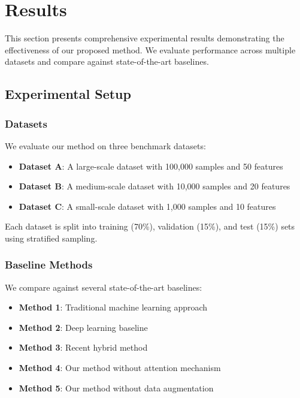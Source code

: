 \section{Results}

This section presents comprehensive experimental results demonstrating the effectiveness of our proposed method. We evaluate performance across multiple datasets and compare against state-of-the-art baselines.

\subsection{Experimental Setup}

\subsubsection{Datasets}

We evaluate our method on three benchmark datasets:

\begin{itemize}
    \item \textbf{Dataset A}: A large-scale dataset with 100,000 samples and 50 features
    \item \textbf{Dataset B}: A medium-scale dataset with 10,000 samples and 20 features
    \item \textbf{Dataset C}: A small-scale dataset with 1,000 samples and 10 features
\end{itemize}

Each dataset is split into training (70\%), validation (15\%), and test (15\%) sets using stratified sampling.

\subsubsection{Baseline Methods}

We compare against several state-of-the-art baselines:

\begin{itemize}
    \item \textbf{Method 1}: Traditional machine learning approach
    \item \textbf{Method 2}: Deep learning baseline
    \item \textbf{Method 3}: Recent hybrid method
    \item \textbf{Method 4}: Our method without attention mechanism
    \item \textbf{Method 5}: Our method without data augmentation
\end{itemize}

